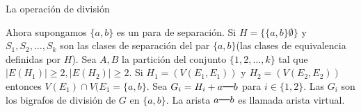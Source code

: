\documentclass[spanish]{beamer}
\begin{document}
\begin{frame}{La operación de división}
\begin{block}
Ahora supongamos $\{a, b\}$ es un para de separación. Si $H=\{\{a, b\}\emptyset\}$ y $S_{1},S_{2}, \ldots, S_{k}$ son las clases de separación del par $\{a, b\}$(las clases de equivalencia definidas por $H$). Sea $A, B$ la partición del conjunto $\{1,2,\ldots,k\}$ tal que  $|E(H_{1})| \geq 2, |E(H_{2})| \geq 2$. Si $H_{1} = (V(E_{1}, E_{1}))$ y $H_{2} = (V(E_{2}, E_{2}))$ entonces $V(E_{1}) \cap V(E_{1} = \{a, b\}$. Sea $G_{i} = H_{i} + a\rule[1mm]{4mm}{0.3mm} b$ para $i \in \{1, 2\}$. Las $G_{i}$ son los bigrafos de división de $G$ en $\{a, b\}$. La arista $a\rule[1mm]{4mm}{0.3mm} b$ es llamada arista virtual.
\end{block}
 
\end{frame}
\end{document}
